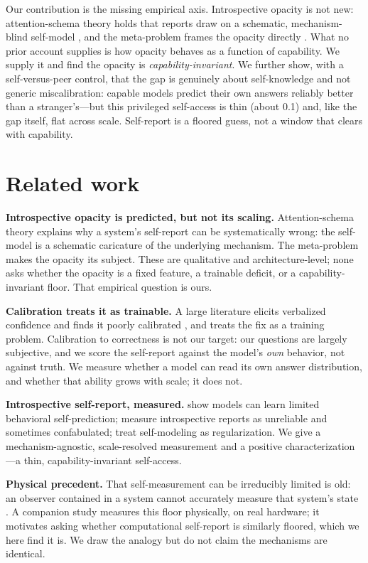 \documentclass[10pt,twocolumn]{article}
\begin{document}
Our contribution is the missing empirical axis. Introspective opacity is not new: attention-schema theory
holds that reports draw on a schematic, mechanism-blind self-model \citep{webb2015}, and the meta-problem
frames the opacity directly \citep{chalmers2018}. What no prior account supplies is how opacity behaves as a
function of capability. We supply it and find the opacity is \emph{capability-invariant}. We further show,
with a self-versus-peer control, that the gap is genuinely about self-knowledge and not generic
miscalibration: capable models predict their own answers reliably better than a stranger's---but this
privileged self-access is thin (about 0.1) and, like the gap itself, flat across scale. Self-report is a
floored guess, not a window that clears with capability.

\section{Related work}
\textbf{Introspective opacity is predicted, but not its scaling.} Attention-schema theory \citep{webb2015,
wilterson2021} explains why a system's self-report can be systematically wrong: the self-model is a
schematic caricature of the underlying mechanism. The meta-problem \citep{chalmers2018} makes the opacity
its subject. These are qualitative and architecture-level; none asks whether the opacity is a fixed
feature, a trainable deficit, or a capability-invariant floor. That empirical question is ours.

\textbf{Calibration treats it as trainable.} A large literature elicits verbalized confidence and finds it
poorly calibrated \citep{kadavath2022}, and treats the fix as a training problem. Calibration to
correctness is not our target: our questions are largely subjective, and we score the self-report against
the model's \emph{own} behavior, not against truth. We measure whether a model can read its own answer
distribution, and whether that ability grows with scale; it does not.

\textbf{Introspective self-report, measured.} \citet{binder2025} show models can learn limited behavioral
self-prediction; \citet{anthropic2025} measure introspective reports as unreliable and sometimes
confabulated; \citet{premakumar2024} treat self-modeling as regularization. We give a mechanism-agnostic,
scale-resolved measurement and a positive characterization---a thin, capability-invariant self-access.

\textbf{Physical precedent.} That self-measurement can be irreducibly limited is old: an observer contained
in a system cannot accurately measure that system's state \citep{breuer1995}. A companion study measures
this floor physically, on real hardware; it motivates asking whether computational self-report is similarly
floored, which we here find it is. We draw the analogy but do not claim the mechanisms are identical.
\end{document}

